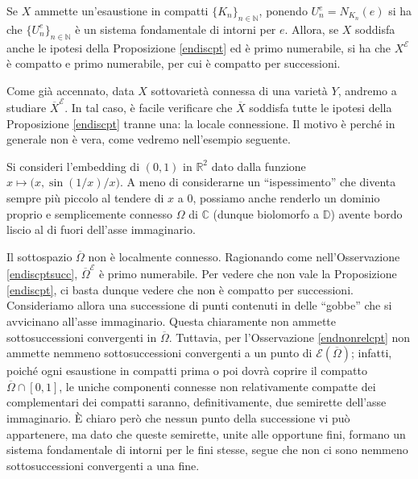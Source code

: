 \begin{oss} \label{endiscptsucc}
    Se $X$ ammette un'esaustione in compatti $\{K_n\}_{n\in\mathbb{N}}$, ponendo $U_n^e=N_{K_n}(e)$ si ha che $\{U_n^e\}_{n\in\mathbb{N}}$ è un sistema fondamentale di intorni per $e$. Allora, se $X$ soddisfa anche le ipotesi della Proposizione \ref{endiscpt} ed è primo numerabile, si ha che $X^\mathcal{E}$ è compatto e primo numerabile, per cui è compatto per successioni.
\end{oss}

\begin{oss} \label{servelocconn}
    Come già accennato, data $X$ sottovarietà connessa di una varietà $Y$, andremo a studiare $\overline{X}^\mathcal{E}$. In tal caso, è facile verificare che $\overline{X}$ soddisfa tutte le ipotesi della Proposizione \ref{endiscpt} tranne una: la locale connessione. Il motivo è perché in generale non è vera, come vedremo nell'esempio seguente.
\end{oss}

\begin{ex} \label{servelocconnex}
    Si consideri l'embedding di $(0,1)$ in $\mathbb{R}^2$ dato dalla funzione $x\longmapsto \big(x,\sin(1/x)/x\big)$. A meno di considerarne un ``ispessimento'' che diventa sempre più piccolo al tendere di $x$ a $0$, possiamo anche renderlo un dominio proprio e semplicemente connesso $\Omega$ di $\mathbb{C}$ (dunque biolomorfo a $\mathbb{D}$) avente bordo liscio al di fuori dell'asse immaginario.

    Il sottospazio $\overline{\Omega}$ non è localmente connesso. Ragionando come nell'Osservazione \ref{endiscptsucc}, $\overline{\Omega}^\mathcal{E}$ è primo numerabile. Per vedere che non vale la Proposizione \ref{endiscpt}, ci basta dunque vedere che non è compatto per successioni. Consideriamo allora una successione di punti contenuti in delle ``gobbe'' che si avvicinano all'asse immaginario. Questa chiaramente non ammette sottosuccessioni convergenti in $\overline{\Omega}$. Tuttavia, per l'Osservazione \ref{endnonrelcpt} non ammette nemmeno sottosuccessioni convergenti a un punto di $\mathcal{E}(\overline{\Omega})$; infatti, poiché ogni esaustione in compatti prima o poi dovrà coprire il compatto $\overline{\Omega}\cap[0,1]$, le uniche componenti connesse non relativamente compatte dei complementari dei compatti saranno, definitivamente, due semirette dell'asse immaginario. È chiaro però che nessun punto della successione vi può appartenere, ma dato che queste semirette, unite alle opportune fini, formano un sistema fondamentale di intorni per le fini stesse, segue che non ci sono nemmeno sottosuccessioni convergenti a una fine.
\end{ex}

